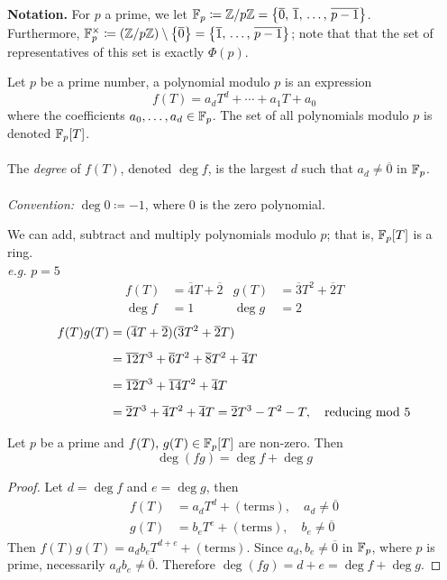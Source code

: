 {\bf Notation.} For $p$ a prime, we let $\mathbb F_p \coloneqq \mathbb Z/p\mathbb Z = \left\{\overline{0},\,\overline{1},\,\ldots,\,\overline{p-1}\right\}$.\\[0.5em]
Furthermore, $\mathbb F_p^\times \coloneqq (\mathbb Z/p\mathbb Z)\setminus\left\{\overline{0}\right\} = \left\{\overline{1},\,\ldots,\,\overline{p-1}\right\}$; note that that the set of representatives of this set is exactly $\Phi(p)$.

\vspace*{2em}

\begin{definition}
Let $p$ be a prime number, a polynomial modulo $p$ is an expression
\[f(T) = a_dT^d + \cdots + a_1T + a_0\]
where the coefficients $a_0,\ldots,a_d \in \mathbb F_p$. The set of all polynomials modulo $p$ is denoted $\mathbb F_p[T]$.\\
\\
The \emph{degree} of $f(T)$, denoted $\deg f$, is the largest $d$ such that $a_d \neq \overline{0}$ in $\mathbb F_p$.\\
\\
\textsl{Convention:} $\deg 0 \coloneqq -1$, where $0$ is the zero polynomial.
\end{definition}

\vspace*{1em}

We can add, subtract and multiply polynomials modulo $p$; that is, $\mathbb F_p[T]$ is a ring.\\[0.5em]
\emph{e.g.} $p = 5$
\begin{align*}
f(T) &= \overline{4}T + \overline{2} & g(T) &= \overline{3}T^2 + \overline{2}T\\[0.5em]
\deg f &= 1 & \deg g &= 2
\end{align*}
\begin{align*}
f(T)g(T) &= (\overline{4}T + \overline{2})(\overline{3}T^2 + \overline{2}T)\\[0.5em]
&= \overline{12}T^3 + \overline{6}T^2 + \overline{8}T^2 + \overline{4}T\\[0.5em]
&= \overline{12}T^3 + \overline{14}T^2 + \overline{4}T\\[0.5em]
&= \overline{2}T^3 + \overline{4}T^2 + \overline{4}T = \overline{2}T^3 - T^2 - T,\quad \text{reducing$\text{ mod }{5}$}
\end{align*}

\vspace*{1em}

\begin{theorem}\label{degsumprod}
Let $p$ be a prime and $f(T),\,g(T) \in \mathbb F_p[T]$ are non-zero. Then
\[\deg (fg) = \deg f + \deg g\]
\end{theorem}
\begin{proof}
Let $d = \deg f$ and $e = \deg g$, then
\begin{align*}
f(T) &= a_dT^d + (\text{terms}),\quad a_d \neq \overline{0}\\[0.5em]
g(T) &= b_eT^e + (\text{terms}),\quad b_e \neq \overline{0}
\end{align*}
Then $f(T)g(T) = a_db_e T^{d+e} + (\text{terms})$. Since $a_d,b_e \neq \overline{0}$ in $\mathbb F_p$, where $p$ is prime, necessarily $a_db_e \neq \overline{0}$. Therefore $\deg(fg) = d + e = \deg f + \deg g$. 
\end{proof}

